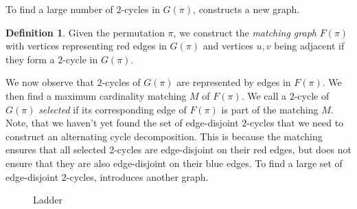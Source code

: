 \documentclass[11pt,DIV=11]{scrartcl}
\theoremstyle{definition}
\newtheorem{definition}[theorem]{Definition}
\theoremstyle{remark}
\begin{document}
To find a large number of $2$-cycles in $G(\pi)$, \citeauthor*{Christie1998} constructs a new graph.

\begin{definition}
Given the permutation $\pi$, we construct the \textit{matching graph} $F(\pi)$ with vertices representing red edges in $G(\pi)$ and vertices $u, v$ being adjacent if they form a $2$-cycle in $G(\pi)$.
\end{definition}

We now observe that $2$-cycles of $G(\pi)$ are represented by edges in $F(\pi)$. We then find a maximum cardinality matching $M$ of $F(\pi)$. We call a $2$-cycle of $G(\pi)$ \textit{selected} if its corresponding edge of $F(\pi)$ is part of the matching $M$. Note, that we haven't yet found the set of edge-disjoint $2$-cycles that we need to construct an alternating cycle decomposition. This is because the matching ensures that all selected $2$-cycles are edge-disjoint on their red edges, but does not ensure that they are also edge-disjoint on their blue edges. To find a large set of edge-disjoint $2$-cycles, \citeauthor*{Christie1998} introduces another graph.

\begin{figure}
    \centering
    \caption{Ladder}
    \label{fig:ladder}
\end{figure}
\end{document}
